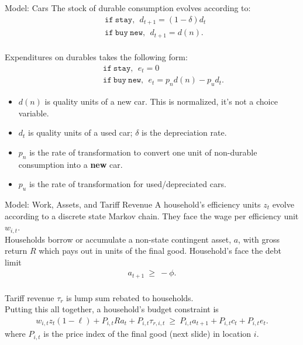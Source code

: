 \documentclass[9pt,pdftex,aspectratio=1610]{beamer}
\theoremstyle{definition}
\begin{document}

\begin{frame}[t]{Model: Cars}
\medskip
The stock of durable consumption evolves according to:
\begin{align*}
&\mathtt{if} \ \mathtt{stay}, \ \ d_{t+1} = (1-\delta)d_{t}
\\
&\mathtt{if} \ \mathtt{buy \ new}, \ \ d_{t+1} = d(n).
\end{align*}\\
\medskip
Expenditures on durables takes the following form:
\begin{align*}
& \ \ \ \ \ \ \ \ \ \mathtt{if} \ \mathtt{stay}, \ \  e_{t} = 0
\\
& \ \ \ \ \ \ \ \ \ \mathtt{if} \ \mathtt{buy \ new}, \ \ e_{t} = p_{n}d(n) - p_{u}d_{t}.
\end{align*}
\begin{itemize}
\item $d(n)$ is quality units of a new car. This is normalized, it's not a choice variable.
\smallskip
\item $d_{t}$ is quality units of a used car; $\delta$ is the depreciation rate.
\smallskip
\item $p_{n}$ is the rate of transformation to convert one unit of non-durable consumption into a \textbf{new} car.
\smallskip
\item $p_{u}$ is the rate of transformation for used/depreciated cars.
\end{itemize}
\end{frame}


\begin{frame}[t]{Model: Work, Assets, and Tariff Revenue}
\medskip
A household's efficiency units $z_t$ evolve according to a discrete state Markov chain. They face the wage per efficiency unit $w_{i,t}$.\\
\bigskip
Households borrow or accumulate a non-state contingent asset, $a$, with gross return $R$ which pays out in units of the final good. Household's face the debt limit
\begin{align*}
a_{t+1} \ \geq \ -\phi.
\end{align*}\\

Tariff revenue $\tau_{r}$ is lump sum rebated to households. \\
\bigskip
Putting this all together, a household's budget constraint is
\begin{align*}
w_{i,t} z_{t} (1 - \ell)  + P_{i,t} R a_{t} + P_{i,t} \tau_{r,i,t} \  \geq \ P_{i,t} a_{t+1} + P_{i,t} c_{t} + P_{i,t} e_{t}.
\end{align*}
where $P_{i,t}$ is the price index of the final good (next slide) in location $i$.
\end{frame}
\end{document}
